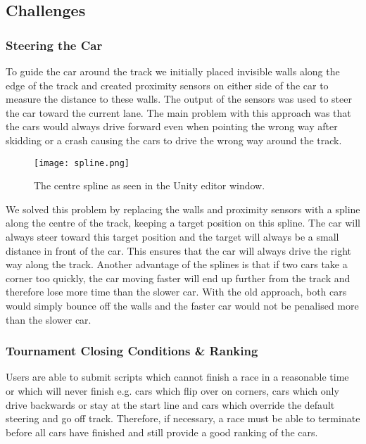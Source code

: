\subsection{Challenges}

\subsubsection{Steering the Car}
To guide the car around the track we initially placed invisible walls along the edge of the track and created proximity sensors on either side of the car to measure the distance to these walls. The output of the sensors was used to steer the car toward the current lane. The main problem with this approach was that the cars would always drive forward even when pointing the wrong way after skidding or a crash causing the cars to drive the wrong way around the track.

\begin{figure}[H]
\centering
\texttt{[image: spline.png]}
\caption{The centre spline as seen in the Unity editor window.}
\end{figure}

We solved this problem by replacing the walls and proximity sensors with a spline along the centre of the track, keeping a target position on this spline. The car will always steer toward this target position and the target will always be a small distance in front of the car. This ensures that the car will always drive the right way along the track. Another advantage of the splines is that if two cars take a corner too quickly, the car moving faster will end up further from the track and therefore lose more time than the slower car. With the old approach, both cars would simply bounce off the walls and the faster car would not be penalised more than the slower car.

\subsubsection{Tournament Closing Conditions \& Ranking}
Users are able to submit scripts which cannot finish a race in a reasonable time or which will never finish e.g. cars which flip over on corners, cars which only drive backwards or stay at the start line and cars which override the default steering and go off track. Therefore, if necessary, a race must be able to terminate before all cars have finished and still provide a good ranking of the cars.


